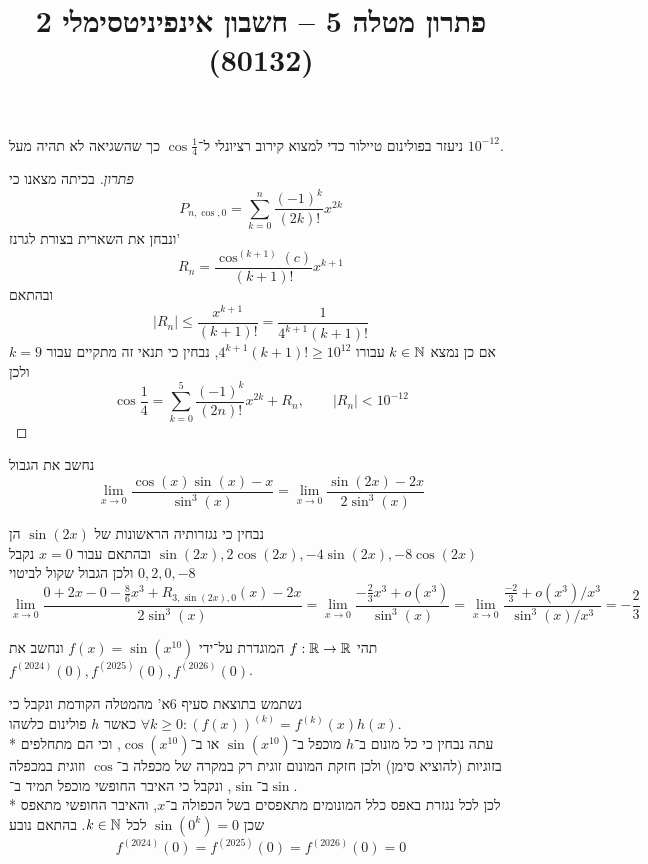 
\usepackage{tikz}
\DeclareMathOperator\arcsinh{arcsinh}
\title{פתרון מטלה 5 – חשבון אינפיניטסימלי 2 (80132)}


\maketitle
\maketitleprint{}

\Question{}
ניעזר בפולינום טיילור כדי למצוא קירוב רציונלי ל־$\cos \frac{1}{4}$ כך שהשגיאה לא תהיה מעל $10^{-12}$.
\begin{proof}[פתרון]
	בכיתה מצאנו כי
	\[
		P_{n, \cos, 0} = \sum_{k = 0}^{n} \frac{{(-1)}^k}{(2k)!} x^{2k}
	\]
	ונבחן את השארית בצורת לגרנז'
	\[
		R_n = \frac{\cos^{(k + 1)}(c)}{(k + 1)!}x^{k + 1}
	\]
	ובהתאם
	\[
		|R_n| \le \frac{x^{k + 1}}{(k + 1)!} = \frac{1}{4^{k + 1}(k + 1)!}
	\]
	אם כן נמצא $k \in \mathbb{N}$ עבורו $4^{k + 1} (k + 1)! \ge 10^{12}$, נבחין כי תנאי זה מתקיים עבור $k = 9$ ולכן
	\[
		\cos \frac{1}{4} = \sum_{k = 0}^{5} \frac{{(-1)}^k}{(2n)!} x^{2k} + R_n,
		\qquad |R_n| < 10^{-12}
	\]
\end{proof}

\Question{}
נחשב את הגבול
\[
	\lim_{x \to 0} \frac{\cos(x) \sin(x) - x}{\sin^3(x)}
	= \lim_{x \to 0} \frac{\sin(2x) - 2x}{2\sin^3(x)}
\]

נבחין כי נגזרותיה הראשונות של $\sin(2x)$ הן $\sin(2x), 2\cos(2x), -4\sin(2x), -8\cos(2x)$ ובהתאם עבור $x = 0$ נקבל $0, 2, 0, -8$
ולכן הגבול שקול לביטוי
\[
	\lim_{x \to 0} \frac{0 + 2x - 0 - \frac{8}{6} x^3 + R_{3,\sin(2x), 0}(x) - 2x}{2 \sin^3(x)}
	= \lim_{x \to 0} \frac{-\frac{2}{3}x^3 + o(x^3)}{\sin^3(x)}
	= \lim_{x \to 0} \frac{\frac{-2}{3} + o(x^3)/x^3}{\sin^3(x)/x^3}
	= -\frac{2}{3}
\]

\Question{}
תהי $f : \mathbb{R} \to \mathbb{R}$ המוגדרת על־ידי $f(x) = \sin(x^{10})$ ונחשב את $f^{(2024)}(0),f^{(2025)}(0),f^{(2026)}(0)$.

נשתמש בתוצאת סעיף 6א' מהמטלה הקודמת ונקבל כי $\forall k \ge 0 : {(f(x))}^{(k)} = f^{(k)}(x) h(x)$ כאשר $h$ פולינום כלשהו. \\*
עתה נבחין כי כל מונום ב־$h$ מוכפל ב־$\sin(x^{10})$ או ב־$\cos(x^{10})$, וכי הם מתחלפים בזוגיות (להוציא סימן) ולכן חזקת המונום זוגית רק במקרה של מכפלה ב־$\cos$ וזוגית במכפלה ב־$\sin$, ונקבל כי האיבר החופשי מוכפל תמיד ב־$\sin$. \\*
לכן לכל נגזרת באפס כלל המונומים מתאפסים בשל הכפולה ב־$x$, והאיבר החופשי מתאפס שכן $\sin(0^k) = 0$ לכל $k \in \mathbb{N}$.
בהתאם נובע
\[
	f^{(2024)}(0) = f^{(2025)}(0) = f^{(2026)}(0) = 0
\]

